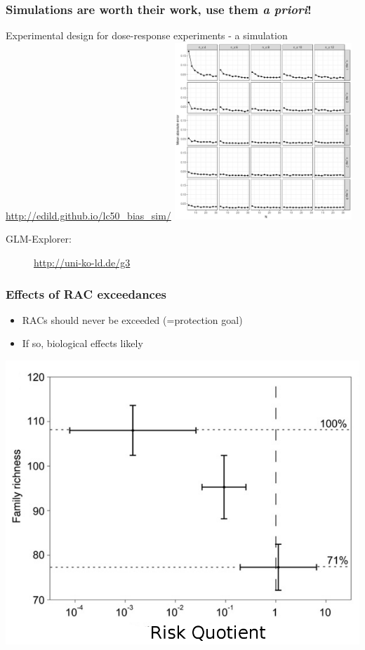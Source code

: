 \documentclass[
	10pt
	]{beamer}
\begin{document}
\begin{frame}
\frametitle{Simulations are worth their work, use them \emph{a priori}!}
	Experimental design for dose-response experiments - a simulation \\
	\url{http://edild.github.io/lc50_bias_sim/}
		    	\includegraphics[width=0.5\textwidth, keepaspectratio]{figs/sim_drm.png} \\
	\begin{description}
		\item[GLM-Explorer:]{\url{http://uni-ko-ld.de/g3}}
	\end{description}
\end{frame}


{%
\begin{frame}
\frametitle{Effects of RAC exceedances}
			\begin{itemize}
				\item RACs should never be exceeded (=protection goal)
				\item If so, biological effects likely
			\end{itemize}
	    	    	\includegraphics[height=0.7\textheight]{figs/stehle_pnas_2015_mod.png}
\end{frame}
}
\end{document}
